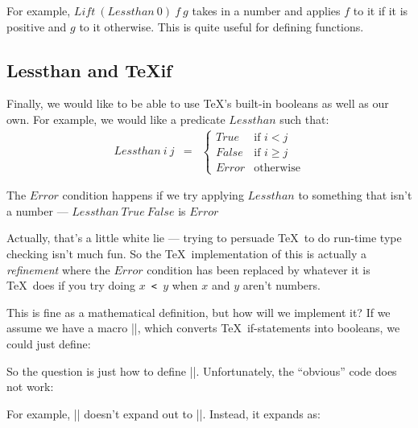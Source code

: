 For example, $Lift~(Lessthan~0)~f~g$ takes in a number and applies
$f$ to it if it is positive and $g$ to it otherwise.  This is quite
useful for defining functions.

\begin{teX}
\def\Lift#1#2#3#4{#1{#4}{#2}{#3}{#4}}
\end{teX}




\subsection{Lessthan and \TeX if}

Finally, we would like to be able to use \TeX's built-in booleans
as well as our own.  For example, we would like a predicate
$Lessthan$ such that:
\begin{eqnarray*}
   Lessthan~i~j  &  
   =  &
   \left\{
      \begin{array}{ll}
         True   &  \mbox{if } i < j    \\
         False  &  \mbox{if } i \ge j  \\
         Error  &  \mbox{otherwise}  
      \end{array}
   \right.
\end{eqnarray*}


The $Error$ condition happens if we try applying $Lessthan$ to something
that isn't a number --- $Lessthan~True~False$ is $Error$

{Actually, that's a little white lie --- trying to persuade \TeX\ to
    do run-time type checking isn't much fun.  So the \TeX\ implementation
    of this is actually a {\em refinement\/} where the $Error$ condition
    has been replaced by whatever it is \TeX\ does if you try doing
    {\tt\string\ifnum $x$ < $y$} when $x$ and $y$ aren't numbers}.

This is fine as a mathematical definition, but how will
we implement it?  If we assume we have a macro |\TeXif|,
which converts \TeX\ if-statements into booleans, we could just
define:
\begin{teX}
\def\Lessthan#1#2{\TeXif{\ifnum#1<#2 }}
\end{teX}
So the question is just how to define |\TeXif|.
Unfortunately, the ``obvious'' code does not work:
\begin{teX}
\def\TeXif#1#2#3{#1#2\else#3\fi}
\end{teX}
For example, |\TeXif\iftrue\True\True| doesn't expand out to
|\True|.  Instead, it expands as:



